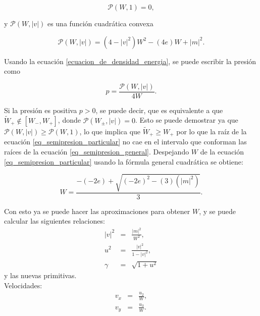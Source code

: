 \documentclass[12pt,a4paper]{book}
\providecommand{\abs}[1]{\lvert#1\rvert} %
\begin{document}
\begin{equation} \label{eq_semipresion_particular}
  \mathcal{P}(W,1)=0, 
\end{equation}

\noindent y $\mathcal{P}(W,\abs{v})$ es una función cuadrática convexa

\begin{equation} \label{eq_semipresion_general}
  \mathcal{P}(W,\abs{v}) = (4-\abs{v}^2)W^2-(4e)W+\abs{m}^2.
\end{equation}


\noindent Usando la ecuación \ref{ecuacion_de_densidad_energia}, se puede escribir la presión como 

\begin{equation}
  p = \frac{\mathcal{P}(W,\abs{v})}{4W}.
\end{equation}

\noindent Si la presión es positiva $p > 0$, se puede decir, que es equivalente a que $\tilde{W}_{+} \notin  \left[W_-, W_+\right]$, donde $\mathcal{P}(W_{\pm},\abs{v})=0$.
Esto se puede demostrar ya que $\mathcal{P}(W,\abs{v}) \geqslant \mathcal{P}(W,1)$, lo que implica que $\tilde{W}_{+} \geqslant W_+$ por lo que la raíz de la ecuación \ref{eq_semipresion_particular} no cae
en el intervalo que conforman las raíces de la ecuación \ref{eq_semipresion_general}. Despejando $W$ de la ecuación \ref{eq_semipresion_particular} usando la fórmula general cuadrática se obtiene:





\begin{equation}\label{suposicion_de_W}
W=\frac{-(-2e)+\sqrt{(-2e)^{2}-(3)(\abs{m}^{2})}}{3}.
\end{equation}

Con esto ya se puede hacer las aproximaciones para obtener $W$, y se puede calcular las siguientes relaciones: 
\begin{eqnarray}
\abs{v}^{2} &=& \frac{\abs{m}^{2}}{W^{2}}\label{prim_v2},\\ 
u^{2}&=&\frac{\abs{v}^{2}}{1-\abs{v}^{2}}\label{u2},\\
\gamma &=& \sqrt{1+u^{2}}
\end{eqnarray}
y las nuevas primitivas.\\
Velocidades:
\begin{eqnarray}
v_{x}&=&\frac{u_{2}}{W},\\
v_{y}&=&\frac{u_{3}}{W}.\\
\end{eqnarray}
\end{document}
